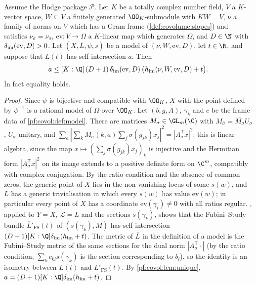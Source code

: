 \begin{theorem}\label{pf:covol:thm:comparison}
Assume the Hodge package $\mathcal P$. Let $K$ be a totally complex number field, $V$ a $K$-vector space,
$W\subseteq V$ a finitely generated $\OO_K$-submodule with $KW=V$, $\nu$ a family of norms on $V$ which
has a Gram frame (\cref{def:covolume:slopes}) and satisfies $\nu_{\bar\sigma}=\nu_\sigma$,
$\mathrm{ev}\colon V\to\Omega$ a $K$-linear map which generates $\Omega$, and $D\in\N$ with
$\delta_{\mathrm{im}}(\mathrm{ev},D)>0$. Let $(X,\overline L,\psi,s)$ be a model of $(\nu,W,\mathrm{ev},D)$, let
$t\in\R$, and suppose that $\overline L(t)$ has self-intersection $a$. Then
\[
a\le[K:\Q]\,(D+1)\,\covolImDeg(\mathrm{ev},D)\,\bigl(\covolImHt(\nu,W,\mathrm{ev},D)+t\bigr).
\]
In fact equality holds.
%
\end{theorem}

\begin{proof}
Since $\psi$ is bijective and compatible with $\OO_K$, $X$ with the point defined by $\psi^{-1}$ is a
rational model of $\Omega$ over $\OO_K$. Let $(b,g,A)$, $\gamma_k$ and $c$ be the frame data of
\cref{pf:covol:def:model}. There are matrices $M_\sigma\in\GL_m(\C)$ with
$M_{\bar\sigma}=\overline{M_\sigma}U_\sigma$, $U_\sigma$ unitary, and
$\sum_a|\sum_kM_\sigma(k,a)\sum_j\sigma(g_{jk})x_j|^2=|A_\sigma^{\mathsf T}x|^2$: this is linear algebra,
since the map $x\mapsto(\sum_j\sigma(g_{jk})x_j)_k$ is injective and the Hermitian form
$|A_\sigma^{\mathsf T}x|^2$ on its image extends to a positive definite form on $\C^m$, compatibly with
complex conjugation. By the ratio condition and the absence of common zeros, the generic point of $X$ lies
in the non-vanishing locus of some $s(w)$, and $L$ has a generic trivialisation in which every $s(w)$ has
value $\mathrm{ev}(w)$; in particular every point of $X$ has a coordinate $\mathrm{ev}(\gamma_i)\ne0$ with
all ratios regular. , applied to $Y=X$, $\mathcal L=L$ and the sections
$s(\gamma_k)$, shows that the Fubini--Study bundle $\overline L'_{\mathrm{FS}}(t)$ of $(s(\gamma_k),M)$ has
self-intersection $(D+1)[K:\Q]\covolImDeg(\covolImHt+t)$. The metric of $\overline L$ in the definition of
a model is the Fubini--Study metric of the same sections for the dual norm $|A_\sigma^{\mathsf T}\cdot|$
(by the ratio condition, $\sum_kc_{kl}s(\gamma_k)$ is the section corresponding to $b_l$), so the
identity is an isometry between $\overline L(t)$ and $\overline L'_{\mathrm{FS}}(t)$. By
\cref{pf:covol:lem:unique}, $a=(D+1)[K:\Q]\covolImDeg(\covolImHt+t)$.
\end{proof}

